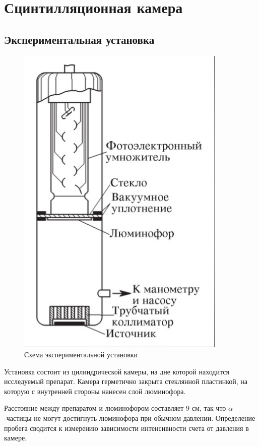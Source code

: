 \documentclass[a4paper,12pt]{article} %
\begin{document}
    \section{Сцинтилляционная камера}

        \subsection{Экспериментальная установка}
        
            \begin{figure}[h]
                \centering
                \includegraphics[width=10cm]{img/Sin.jpg}
                \caption{Схема экспериментальной установки}
                \label{fig1}
            \end{figure}
            Установка состоит из цилиндрической камеры, на дне которой находится исследуемый препарат. 
            Камера герметично закрыта стеклянной пластинкой, на которую с внутренней стороны нанесен слой люминофора.\par
            Расстояние между препаратом и люминофором составляет 9 см, так что $\alpha$-частицы не могут достигнуть люминофора при обычном давлении. 
            Определение пробега сводится к измерению зависимости интенсивности счета от давления в камере.
    \newpage
\end{document}
